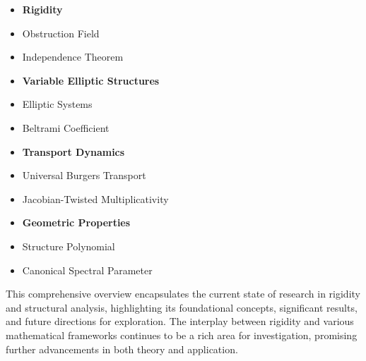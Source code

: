 \documentclass[11pt,a4paper]{article}
\begin{document}
\begin{itemize}
\item \textbf{Rigidity}
\item Obstruction Field
\item Independence Theorem
\item \textbf{Variable Elliptic Structures}
\item Elliptic Systems
\item Beltrami Coefficient
\item \textbf{Transport Dynamics}
\item Universal Burgers Transport
\item Jacobian-Twisted Multiplicativity
\item \textbf{Geometric Properties}
\item Structure Polynomial
\item Canonical Spectral Parameter
\end{itemize}

This comprehensive overview encapsulates the current state of research in rigidity and structural analysis, highlighting its foundational concepts, significant results, and future directions for exploration. The interplay between rigidity and various mathematical frameworks continues to be a rich area for investigation, promising further advancements in both theory and application.
\end{document}
